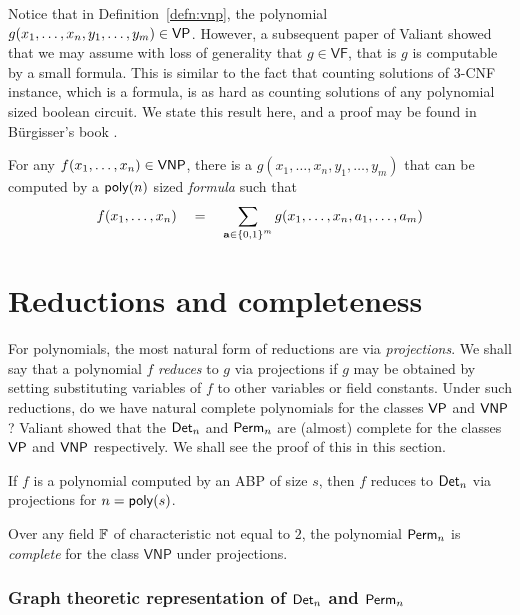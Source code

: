 Notice that in Definition~\ref{defn:vnp}, the polynomial $g(x_1,\dots, x_n, y_1,\dots, y_m) \in \mathsf{VP}$. However, a subsequent paper of Valiant showed that we may assume with loss of generality that $g \in \mathsf{VF}$, that is $g$ is computable by a small formula. This is similar to the fact that counting solutions of 3-\textsf{CNF} instance, which is a formula, is as hard as counting solutions of any polynomial sized boolean circuit. We state this result here, and a proof may be found in B\"urgisser's book \cite{bur00}. 

\begin{theorem}\label{thm:vnp-formula}
For any $f(x_1,\dots, x_n)\in \mathsf{VNP}$, there is a $g(x_1,\dots, x_n, y_1,\dots, y_m)$ that can be computed by a $\mathsf{poly}(n)$ sized \emph{formula} such that 
\[
f(x_1,\dots, x_n)\quad = \quad \sum_{\mathbf{a} \in \left\{0,1\right\}^m} g(x_1,\dots, x_n, a_1,\dots, a_m)
\]
\end{theorem}

\section{Reductions and completeness}

For polynomials, the most natural form of reductions are via \emph{projections}. We shall say that a polynomial $f$ \emph{reduces} to $g$ via projections if $g$ may be obtained by setting substituting variables of $f$ to other variables or field constants. Under such reductions, do we have natural complete polynomials for the classes $\mathsf{VP}$ and $\mathsf{VNP}$? Valiant \cite{v79} showed that the $\mathsf{Det}_n$ and $\mathsf{Perm}_n$ are (almost) complete for the classes $\mathsf{VP}$ and $\mathsf{VNP}$ respectively. We shall see the proof of this in this section. 

\begin{theorem}[\cite{v79}]\label{thm:vp}
If $f$ is a polynomial computed by an ABP of size $s$, then $f$ reduces to $\mathsf{Det}_n$ via projections for $n = \mathsf{poly}(s)$. 
\end{theorem}
\begin{theorem}[\cite{v79}]\label{thm:vnp}
Over any field $\mathbb{F}$ of characteristic not equal to $2$, the polynomial $\mathsf{Perm}_n$ is \emph{complete} for the class $\mathsf{VNP}$ under projections.
\end{theorem}

\subsubsection*{Graph theoretic representation of $\mathsf{Det}_n$ and $\mathsf{Perm}_n$}

